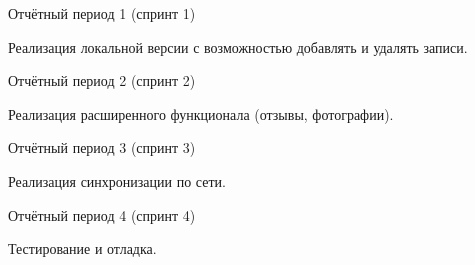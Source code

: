 \documentclass[a4paper,12pt]{article} %
\begin{document}
\begin{enumerate}
{\item Отчётный период 1 (спринт 1)}

Реализация локальной версии с возможностью добавлять и удалять записи.

{\item Отчётный период 2 (спринт 2)}

Реализация расширенного функционала (отзывы, фотографии).

{\item Отчётный период 3 (спринт 3)}

Реализация синхронизации по сети.

{\item Отчётный период 4 (спринт 4)}

Тестирование и отладка.


\end{enumerate}
\end{document}
